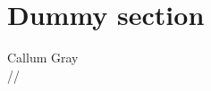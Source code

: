 \documentclass[aps,prb,superscriptaddress,showpacs,
               preprint,amsmath,11pt]{revtex4}
\begin{document}
\section{Dummy section}

{\centering
  Callum Gray \\
}
{\centering
  \number\day{}/\number\month{}/\number\year{} \\ \vspace{0.5cm}
}
\end{document}
